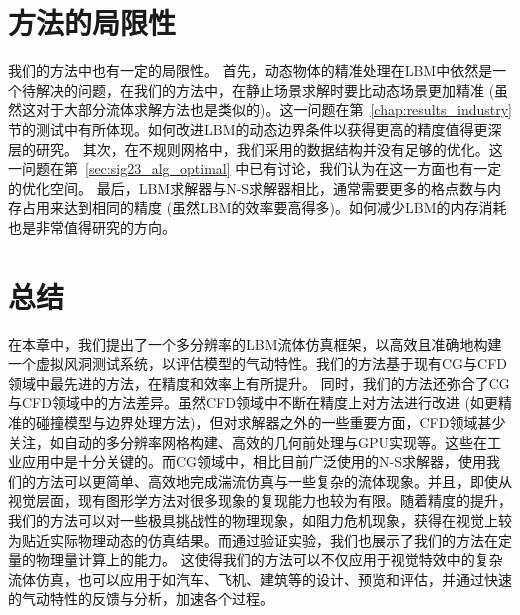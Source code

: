 \section{方法的局限性}
我们的方法中也有一定的局限性。
首先，动态物体的精准处理在LBM中依然是一个待解决的问题，在我们的方法中，在静止场景求解时要比动态场景更加精准 (虽然这对于大部分流体求解方法也是类似的)。这一问题在第~\ref{chap:results_industry} 节的测试中有所体现。如何改进LBM的动态边界条件以获得更高的精度值得更深层的研究。
其次，在不规则网格中，我们采用的数据结构并没有足够的优化。这一问题在第~\ref{sec:sig23_alg_optimal} 中已有讨论，我们认为在这一方面也有一定的优化空间。
最后，LBM求解器与N-S求解器相比，通常需要更多的格点数与内存占用来达到相同的精度 (虽然LBM的效率要高得多)。如何减少LBM的内存消耗也是非常值得研究的方向。

\section{总结}
在本章中，我们提出了一个多分辨率的LBM流体仿真框架，以高效且准确地构建一个虚拟风洞测试系统，以评估模型的气动特性。我们的方法基于现有CG与CFD领域中最先进的方法，在精度和效率上有所提升。
同时，我们的方法还弥合了CG与CFD领域中的方法差异。虽然CFD领域中不断在精度上对方法进行改进 (如更精准的碰撞模型与边界处理方法)，但对求解器之外的一些重要方面，CFD领域甚少关注，如自动的多分辨率网格构建、高效的几何前处理与GPU实现等。这些在工业应用中是十分关键的。而CG领域中，相比目前广泛使用的N-S求解器，使用我们的方法可以更简单、高效地完成湍流仿真与一些复杂的流体现象。并且，即使从视觉层面，现有图形学方法对很多现象的复现能力也较为有限。随着精度的提升，我们的方法可以对一些极具挑战性的物理现象，如阻力危机现象，获得在视觉上较为贴近实际物理动态的仿真结果。而通过验证实验，我们也展示了我们的方法在定量的物理量计算上的能力。
这使得我们的方法可以不仅应用于视觉特效中的复杂流体仿真，也可以应用于如汽车、飞机、建筑等的设计、预览和评估，并通过快速的气动特性的反馈与分析，加速各个过程。

